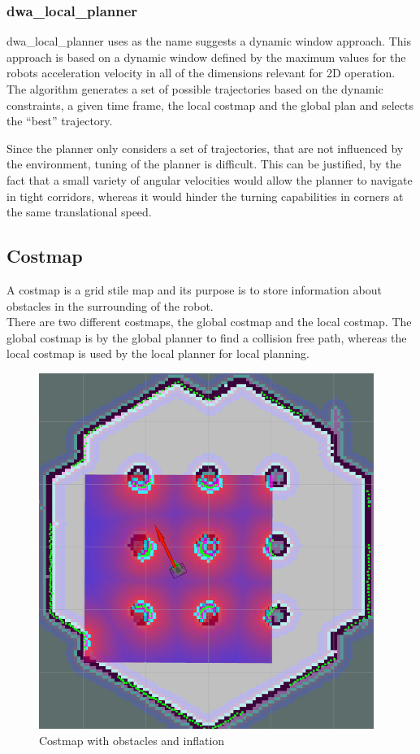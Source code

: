 \subsubsection{dwa\_local\_planner}
dwa\_local\_planner uses as the name suggests a dynamic window approach. This approach is based on a dynamic window defined by the maximum values for the robots acceleration velocity in all of the dimensions relevant for 2D operation.\\
The algorithm generates a set of possible trajectories based on the dynamic constraints, a given time frame, the local costmap and the global plan and selects the ``best'' trajectory\cite{dwa}.

Since the planner only considers a set of trajectories, that are not influenced by the environment, tuning of the planner is difficult. 
This can be justified, by the fact that a small variety of angular velocities would allow the planner to navigate in tight corridors, whereas it would hinder the turning capabilities in corners at the same translational speed.

\subsection{Costmap}
A costmap is a grid stile map and its purpose is to store information about obstacles in the surrounding of the robot.\\
There are two different costmaps, the global costmap and the local costmap.
The global costmap is by the global planner to find a collision free path, whereas the local costmap is used by the local planner for local planning.\cite{navsetup}\\

\begin{figure}[H] 
\centering
	\includegraphics[width=.5\textwidth]{Pictures/inflationref}
	\caption{Costmap with obstacles and inflation \cite{infl}}
	\label{costmap}
\end{figure}


